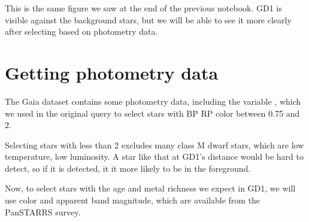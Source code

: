 \documentclass[letterpaper,10pt,english]{sphinxmanual}
\begin{document}
\begin{sphinxVerbatim}[commandchars=\\\{\}]
   

  \PYG{p}{[}\PYG{p}{]}
  \PYG{p}{[}\PYG{p}{]}

    

\end{sphinxVerbatim}

\noindent{}

This is the same figure we saw at the end of the previous notebook.  GD\sphinxhyphen{}1 is visible against the background stars, but we will be able to see it more clearly after selecting based on photometry data.


\section{Getting photometry data}
\label{\detokenize{05_join:getting-photometry-data}}
The Gaia dataset contains some photometry data, including the variable , which we used in the original query to select stars with BP \sphinxhyphen{} RP color between \sphinxhyphen{}0.75 and 2.

Selecting stars with  less than 2 excludes many class M dwarf stars, which are low temperature, low luminosity.  A star like that at GD\sphinxhyphen{}1’s distance would be hard to detect, so if it is detected, it it more likely to be in the foreground.

Now, to select stars with the age and metal richness we expect in GD\sphinxhyphen{}1, we will use  color and apparent \sphinxhyphen{}band magnitude, which are available from the Pan\sphinxhyphen{}STARRS survey.
\end{document}
